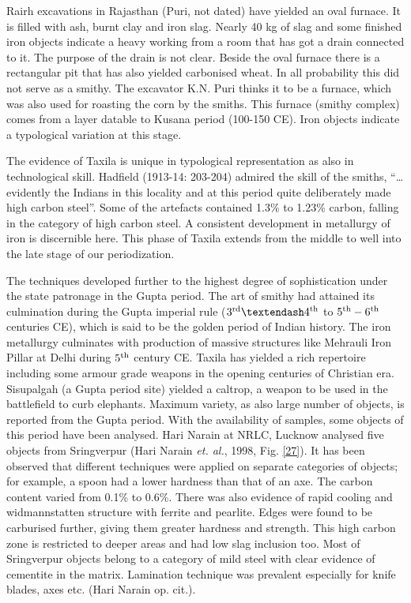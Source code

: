 Rairh excavations in Rajasthan (Puri, not dated) have yielded an oval furnace. It is filled with ash, burnt clay and iron slag. Nearly 40 kg of slag and some finished iron objects indicate a heavy working from a room that has got a drain connected to it. The purpose of the drain is not clear. Beside the oval furnace there is a rectangular pit that has also yielded carbonised wheat. In all probability this did not serve as a smithy. The excavator K.N. Puri thinks it to be a furnace, which was also used for roasting the corn by the smiths. This furnace (smithy complex) comes from a layer datable to Kusana period (100-150 CE). Iron objects indicate a typological variation at this stage.

The evidence of Taxila is unique in typological representation as also in technological skill. Hadfield (1913-14: 203-204) admired the skill of the smiths, “…evidently the Indians in this locality and at this period quite deliberately made high carbon steel”. Some of the artefacts contained 1.3\% to 1.23\% carbon, falling in the category of high carbon steel. A consistent development in metallurgy of iron is discernible here. This phase of Taxila extends from the middle to well into the late stage of our periodization. 

The techniques developed further to the highest degree of sophistication under the state patronage in the Gupta period. The art of smithy had attained its culmination during the Gupta imperial rule ($3^{\rm rd} – 4^{\rm th}$ to $5^{\rm th} - 6^{\rm th}$ centuries CE), which is said to be the golden period of Indian history. The iron metallurgy culminates with production of massive structures like Mehrauli Iron Pillar at Delhi during $5^{\rm th}$ century CE. Taxila has yielded a rich repertoire including some armour grade weapons in the opening centuries of Christian era. Sisupalgah (a Gupta period site) yielded a caltrop, a weapon to be used in the battlefield to curb elephants. Maximum variety, as also large number of objects, is reported from the Gupta period. With the availability of samples, some objects of this period have been analysed. Hari Narain at NRLC, Lucknow analysed five objects from Sringverpur (Hari Narain {\it et. al.}, 1998, Fig. \ref{27}). It has been observed that different techniques were applied on separate categories of objects; for example, a spoon had a lower hardness than that of an axe. The carbon content varied from 0.1\% to 0.6\%. There was also evidence of rapid cooling and widmannstatten structure with ferrite and pearlite. Edges were found to be carburised further, giving them greater hardness and strength. This high carbon zone is restricted to deeper areas and had low slag inclusion too. Most of Sringverpur objects belong to a category of mild steel with clear evidence of cementite in the matrix. Lamination technique was prevalent especially for knife blades, axes etc. (Hari Narain op. cit.). 

